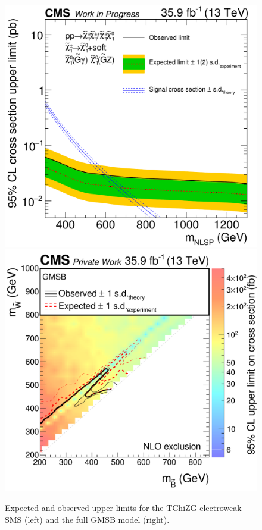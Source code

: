 \begin{figure}[tbp]
 \centering
 \includegraphics[width=\pairwidth]{figures/UnblindingPlots/TChiNG_limit2}
 \includegraphics[width=\pairwidth]{figures/UnblindingPlots/GMSB_limits_XSEC2}
 \caption{Expected and observed upper limits for the TChiZG electroweak SMS (left) and the full GMSB model (right).}
 \label{fig:limitEWK}
\end{figure}
